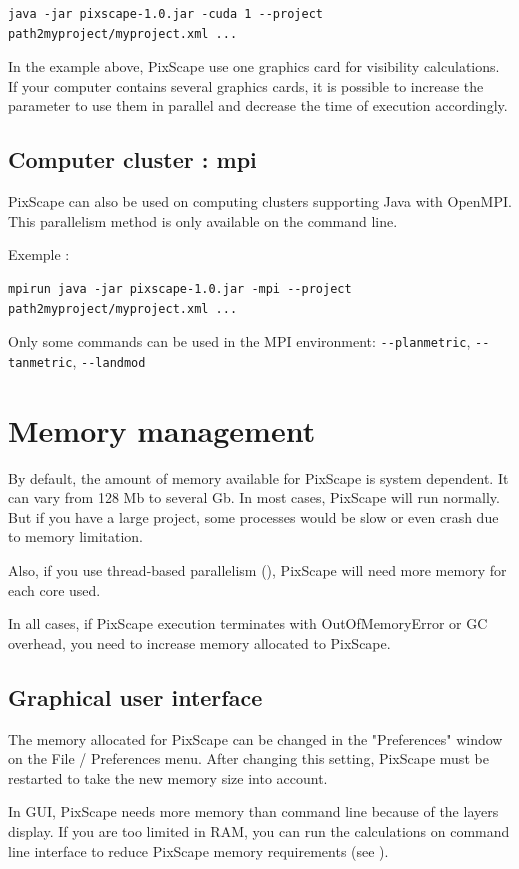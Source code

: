 \documentclass{report}
\begin{document}
\begin{Verbatim}
java -jar pixscape-1.0.jar -cuda 1 --project path2myproject/myproject.xml ...
\end{Verbatim}
In the example above, PixScape use one graphics card for visibility calculations. If your computer contains several graphics cards, it is possible to increase the parameter to use them in parallel and decrease the time of execution accordingly.


\subsection{Computer cluster : mpi}
PixScape can also be used on computing clusters supporting Java with OpenMPI. This parallelism method is only available on the command line.

Exemple :
\begin{Verbatim}
mpirun java -jar pixscape-1.0.jar -mpi --project path2myproject/myproject.xml ...
\end{Verbatim}
Only some commands can be used in the MPI environment: \verb|--planmetric|, \verb|--tanmetric|, \verb|--landmod|


\section{Memory management}
\label{memory}
By default, the amount of memory available for PixScape is system dependent.  It can vary from 128 Mb to several Gb.  In most cases, PixScape will run normally.  But if you have a large project, some processes would be slow or even crash due to memory limitation.

Also, if you use thread-based parallelism (), PixScape will need more memory for each core used.

In all cases, if PixScape execution terminates with OutOfMemoryError
or GC overhead, you need to increase memory allocated to PixScape.


\subsection{Graphical user interface}
The memory allocated for PixScape can be changed in the "Preferences" window on the File / Preferences menu. After changing this setting, PixScape must be restarted to take the new memory size into account.

In GUI, PixScape needs more memory than command line because of the layers display. If you are too limited in RAM, you can run the calculations on command line interface to reduce PixScape memory requirements (see ).
\end{document}
